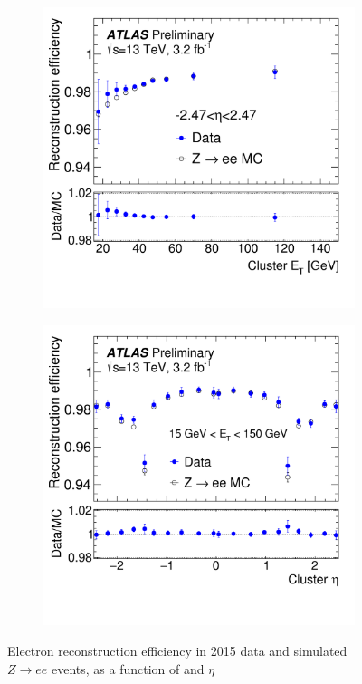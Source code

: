 \begin{figure}[h]
\begin{center}
\begin{subfigure}[b]{0.45\textwidth}
\centering
      \includegraphics[width=\textwidth]{fig/ele_reco_eff.png}
     \caption{}
      \label{fig:ele_reco_pt_eff}
  \end{subfigure}
 \begin{subfigure}[b]{0.45\textwidth}
 \centering
      \includegraphics[width=\textwidth]{fig/ele_reco_eta_eff.png}
      \caption{}
      \label{fig:ele_reco_eta_eff}
  \end{subfigure}
\caption{Electron reconstruction efficiency in 2015 data and simulated $Z\rightarrow ee$ events, as a function of \et and $\eta$ \cite{ATLAS-CONF-2016-024}} 
 \label{fig:ele_reco_eff}
\end{center}
\end{figure}
